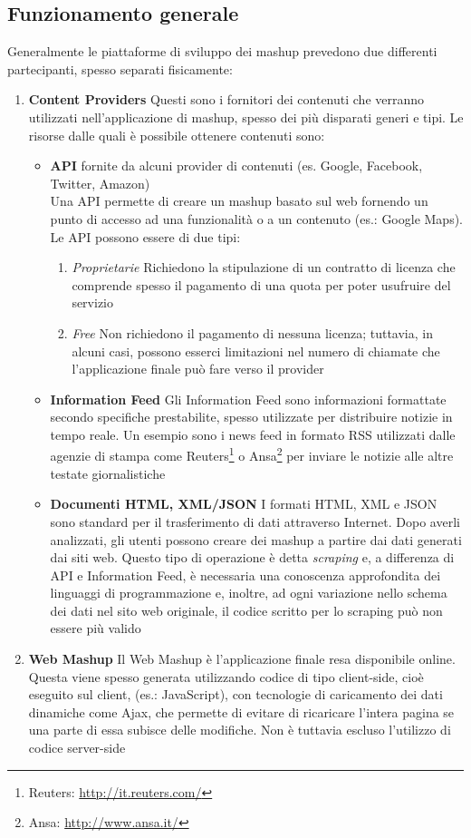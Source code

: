 \subsection{Funzionamento generale\label{sec:mashup-operations}}
Generalmente le piattaforme di sviluppo dei mashup prevedono due differenti partecipanti, spesso separati fisicamente:
\begin{enumerate}
	\item \textbf{Content Providers} Questi sono i fornitori dei contenuti che verranno utilizzati nell'applicazione di mashup, spesso dei più disparati generi e tipi.
	Le risorse dalle quali è possibile ottenere contenuti sono:
	\begin{itemize}
		\item \textbf{API} fornite da alcuni provider di contenuti (es. Google, Facebook, Twitter, Amazon)\\
		Una API permette di creare un mashup basato sul web fornendo un punto di accesso ad una funzionalità o a un contenuto (es.: Google Maps).
		Le API possono essere di due tipi:
		\begin{enumerate}
			\item \emph{Proprietarie} Richiedono la stipulazione di un contratto di licenza che comprende spesso il pagamento di una quota per poter usufruire del servizio
			\item \emph{Free} Non richiedono il pagamento di nessuna licenza; tuttavia, in alcuni casi, possono esserci limitazioni nel numero di chiamate che l'applicazione finale può fare verso il provider
		\end{enumerate} 
		\item \textbf{Information Feed} Gli Information Feed sono informazioni formattate secondo specifiche prestabilite, spesso utilizzate per distribuire notizie in tempo reale. Un esempio sono i news feed in formato RSS utilizzati dalle agenzie di stampa come Reuters\footnote{Reuters: \url{http://it.reuters.com/}} o Ansa\footnote{Ansa: \url{http://www.ansa.it/}} per inviare le notizie alle altre testate giornalistiche
		\item \textbf{Documenti HTML, XML/JSON} I formati HTML, XML e JSON sono standard per il trasferimento di dati attraverso Internet. Dopo averli analizzati, gli utenti possono creare dei mashup a partire dai dati generati dai siti web. Questo tipo di operazione è detta \emph{scraping} e, a differenza di API e Information Feed, è necessaria una conoscenza approfondita dei linguaggi di programmazione e, inoltre, ad ogni variazione nello schema dei dati nel sito web originale, il codice scritto per lo scraping può non essere più valido
	\end{itemize} 
	\item \textbf{Web Mashup}
	Il Web Mashup è l'applicazione finale resa disponibile online. Questa viene spesso generata utilizzando codice di tipo client-side, cioè eseguito sul client, (es.: JavaScript), con tecnologie di caricamento dei dati dinamiche come Ajax, che permette di evitare di ricaricare l'intera pagina se una parte di essa subisce delle modifiche. Non è tuttavia escluso l'utilizzo di codice server-side
\end{enumerate}

